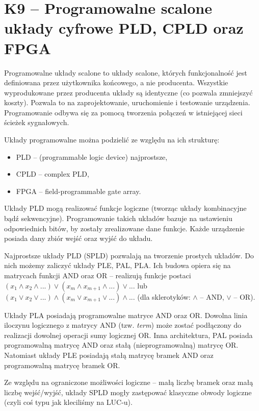 \sloppy\section{K9 -- Programowalne scalone układy cyfrowe PLD, CPLD oraz FPGA}

Programowalne układy scalone to układy scalone, których funkcjonalność jest definiowana przez użytkownika końcowego, a nie producenta. Wszystkie wyprodukowane przez producenta układy są identyczne (co pozwala zmniejszyć koszty). Pozwala to na zaprojektowanie, uruchomienie i testowanie urządzenia. Programowanie odbywa się za pomocą tworzenia połączeń w istniejącej sieci ścieżek sygnałowych. 

Układy programowalne można podzielić ze względu na ich strukturę:
\begin{itemize}
\item PLD -- (programmable logic device) najprostsze,
\item CPLD -- complex PLD,
\item FPGA -- field-programmable gate array.
\end{itemize}

Układy PLD mogą realizować funkcje logiczne (tworząc układy kombinacyjne bądź sekwencyjne). Programowanie takich układów bazuje na ustawieniu odpowiednich bitów, by zostały zrealizowane dane funkcje. Każde urządzenie posiada dany zbiór wejść oraz wyjść do układu.

Najprostsze układy PLD (SPLD) pozwalają na tworzenie prostych układów. Do nich możemy zaliczyć układy PLE, PAL, PLA. Ich budowa opiera się na matrycach funkcji AND oraz OR -- realizują funkcje postaci $(x_{1} \wedge x_{2} \wedge ...) \vee (x_{m} \wedge x_{m+1} \wedge ...) \vee ...$ lub $(x_{1} \vee x_{2} \vee ...) \wedge (x_{m} \vee x_{m+1} \vee ...) \wedge ...$ (dla sklerotyków: $\wedge$ -- AND, $\vee$ -- OR). 

Układy PLA posiadają programowalne matryce AND oraz OR. Dowolna linia iloczynu logicznego z matrycy AND (tzw. \textit{term}) może zostać podłączony do realizacji dowolnej operacji sumy logicznej OR. Inna architektura, PAL posiada programowalną matrycę AND oraz stałą (nieprogramowalną) matrycę OR. Natomiast układy PLE posiadają stałą matrycę bramek AND oraz programowalną matrycę bramek OR.

Ze względu na ograniczone możliwości logiczne -- małą liczbę bramek oraz małą liczbę wejść/wyjść, układy SPLD mogły zastępować klasyczne obwody logiczne (czyli coś typu jak kleciliśmy na LUC-u).

